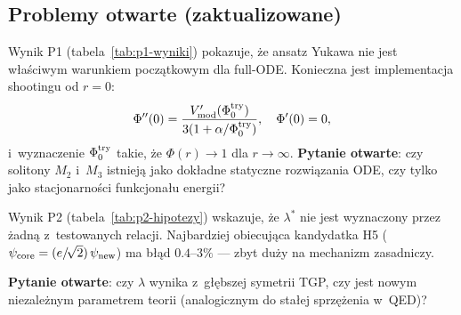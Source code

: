 \subsection{Problemy otwarte (zaktualizowane)}%
\label{app:I-otwarte}

\begin{problem}[Shooting od $r=0$: właściwe równanie ODE dla solitonów]%
\label{prob:ODE}
Wynik P1 (tabela~\ref{tab:p1-wyniki}) pokazuje, że ansatz Yukawa
nie jest właściwym warunkiem początkowym dla full-ODE.
Konieczna jest implementacja shootingu od $r = 0$:
\begin{equation}
    \Phi''(0) = \frac{V'_{\rm mod}(\Phi_0^{\rm try})}{3(1 + \alpha/\Phi_0^{\rm try})},
    \quad \Phi'(0) = 0,
\end{equation}
i~wyznaczenie $\Phi_0^{\rm try}$ takie, że $\Phi(r) \to 1$ dla $r \to \infty$.
\textbf{Pytanie otwarte}: czy solitony $M_2$ i~$M_3$ istnieją jako
dokładne statyczne rozwiązania ODE, czy tylko jako stacjonarności funkcjonału energii?
\end{problem}

\begin{problem}%
\label{prob:lambda-star}
Wynik P2 (tabela~\ref{tab:p2-hipotezy}) wskazuje, że $\lambda^*$
nie jest wyznaczony przez żadną z~testowanych relacji.
Najbardziej obiecująca kandydatka H5 ($\psi_{\rm core} = (e/\!\sqrt{2})\,\psi_{\rm new}$)
ma błąd $0.4\text{--}3\%$ — zbyt duży na mechanizm zasadniczy.

\textbf{Pytanie otwarte}: czy $\lambda$ wynika z~głębszej symetrii TGP,
czy jest nowym niezależnym parametrem teorii (analogicznym do stałej
sprzężenia w~QED)?
\end{problem}

